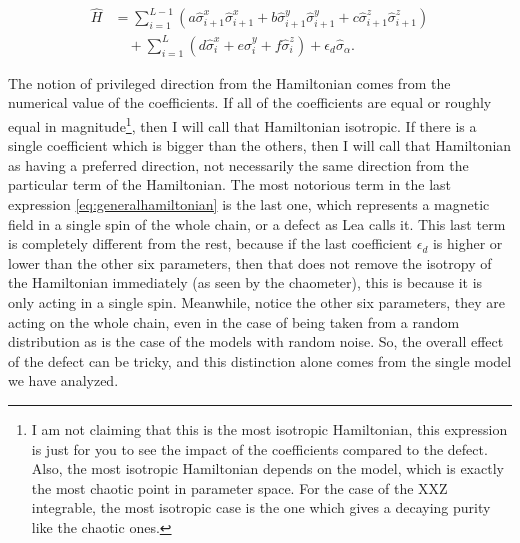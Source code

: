 \begin{equation}
\begin{split}
\hat{H} &= \sum_{i=1}^{L-1}(a\hat{\sigma}_{i+1}^{x}\hat{\sigma}_{i+1}^{x} + b\hat{\sigma}_{i+1}^{y}\hat{\sigma}_{i+1}^{y} + c\hat{\sigma}_{i+1}^{z}\hat{\sigma}_{i+1}^{z}) \\
  &\quad + \sum_{i=1}^{L}(d\hat{\sigma}_{i}^{x} + e\hat{\sigma}_{i}^{y} + f\hat{\sigma}_{i}^{z})+\epsilon_d\hat{\sigma}_\alpha .
    \label{eq:generalhamiltonian}
\end{split}
\end{equation}

The notion of privileged direction from the Hamiltonian comes from the numerical value of the coefficients. If all of the coefficients are equal or roughly equal in magnitude\footnote{I am not claiming that this is the most isotropic Hamiltonian, this expression is just for you to see the impact of the coefficients compared to the defect. Also, the most isotropic Hamiltonian depends on the model, which is exactly the most chaotic point in parameter space. For the case of the XXZ integrable, the most isotropic case is the one which gives a decaying purity like the chaotic ones.}, then I will call that Hamiltonian isotropic. If there is a single coefficient which is bigger than the others, then I will call that Hamiltonian as having a preferred direction, not necessarily the same direction from the particular term of the Hamiltonian.
The most notorious term in the last expression \ref{eq:generalhamiltonian} is the last one, which represents a magnetic field in a single spin of the whole chain, or a defect as Lea calls it. This last term is completely different from the rest, because if the last coefficient $\epsilon_d$ is higher or lower than the other six parameters, then that does not remove the isotropy of the Hamiltonian immediately (as seen by the chaometer), this is because it is only acting in a single spin. Meanwhile, notice the other six parameters, they are acting on the whole chain, even in the case of being taken from a random distribution as is the case of the models with random noise. So, the overall effect of the defect can be tricky, and this distinction alone comes from the single model we have analyzed.\\

